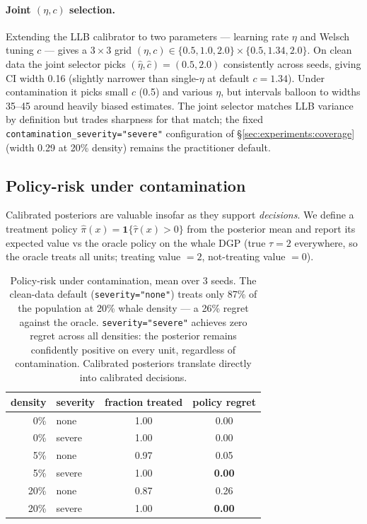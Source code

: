 \paragraph{Joint $(\eta, c)$ selection.}
Extending the LLB calibrator to two parameters --- learning rate
$\eta$ and Welsch tuning $c$ --- gives a $3 \times 3$ grid
$(\eta, c) \in \{0.5, 1.0, 2.0\} \times \{0.5, 1.34, 2.0\}$. On
clean data the joint selector picks $(\hat\eta, \hat c) = (0.5,
2.0)$ consistently across seeds, giving CI width 0.16 (slightly
narrower than single-$\eta$ at default $c = 1.34$). Under
contamination it picks small $c$ (0.5) and various $\eta$, but
intervals balloon to widths 35--45 around heavily biased estimates.
The joint selector matches LLB variance by definition but trades
sharpness for that match; the fixed
\texttt{contamination\_severity="severe"} configuration of
\S\ref{sec:experiments:coverage} (width 0.29 at 20\% density)
remains the practitioner default.

\subsection{Policy-risk under contamination}
\label{sec:experiments:policy_risk}
Calibrated posteriors are valuable insofar as they support
\emph{decisions}. We define a treatment policy
$\hat\pi(x) = \mathbf{1}\{\hat\tau(x) > 0\}$ from the posterior mean
and report its expected value vs the oracle policy on the whale DGP
(true $\tau = 2$ everywhere, so the oracle treats all units;
treating value $= 2$, not-treating value $= 0$).

\begin{table}[!t]
\centering
\small
\begin{tabular}{rlcc}
\toprule
density & severity & fraction treated & policy regret \\
\midrule
0\%   & none   & 1.00 & 0.00 \\
0\%   & severe & 1.00 & 0.00 \\
5\%   & none   & 0.97 & 0.05 \\
5\%   & severe & 1.00 & \textbf{0.00} \\
20\%  & none   & 0.87 & 0.26 \\
20\%  & severe & 1.00 & \textbf{0.00} \\
\bottomrule
\end{tabular}
\caption{Policy-risk under contamination, mean over 3 seeds.
The clean-data default (\texttt{severity="none"}) treats only 87\%
of the population at 20\% whale density --- a 26\% regret against
the oracle. \texttt{severity="severe"} achieves zero regret across
all densities: the posterior remains confidently positive on every
unit, regardless of contamination. Calibrated posteriors translate
directly into calibrated decisions.}
\label{tab:policy_risk}
\end{table}

